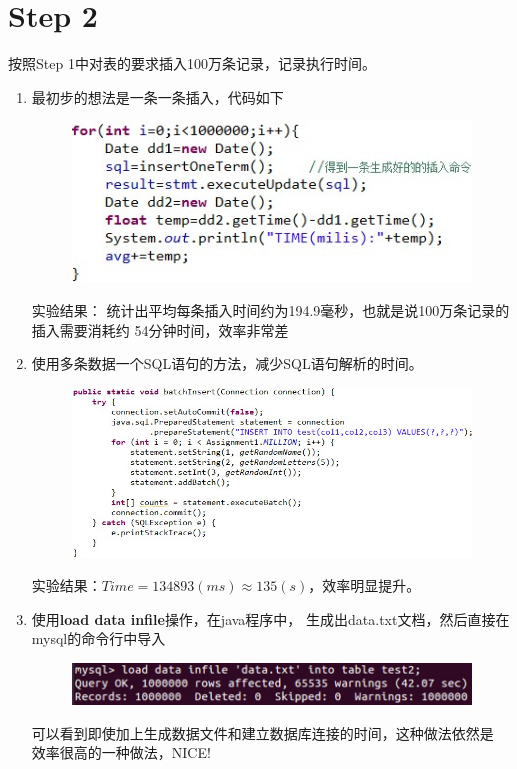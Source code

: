 \documentclass[UTF8]{ctexart}
\begin{document}
\section{Step 2}
按照Step 1中对表的要求插入100万条记录，记录执行时间。
    \begin{enumerate}
        \item 最初步的想法是一条一条插入，代码如下
        \begin{figure}[ht]
            \centering
            \includegraphics[scale=0.7]{db1.jpg}
            \label{fig:db1}
        \end{figure}

        实验结果：
        统计出平均每条插入时间约为194.9毫秒，也就是说100万条记录的插入需要消耗约
        54分钟时间，效率非常差
        \item 使用多条数据一个SQL语句的方法，减少SQL语句解析的时间。
        \begin{figure}[ht]
            \centering
            \includegraphics[scale=0.7]{db2.jpg}
            \label{fig:db2}
        \end{figure}

        实验结果：$Time=134893(ms)\approx135(s)$，效率明显提升。
        \item 使用\textbf{load data infile}操作，在java程序中，
            生成出data.txt文档，然后直接在mysql的命令行中导入
        \begin{figure}[ht]
            \centering
            \includegraphics[scale=0.4]{db3.jpg}
            \label{fig:db3}
        \end{figure}

        可以看到即使加上生成数据文件和建立数据库连接的时间，这种做法依然是
        效率很高的一种做法，NICE!
    \end{enumerate}
\end{document}
